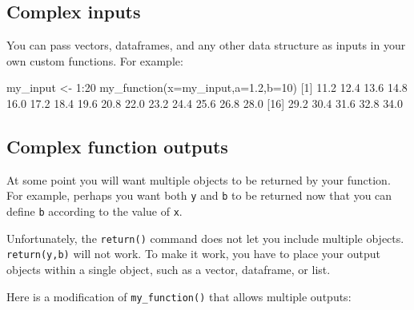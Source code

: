 \documentclass[
]{book}
\newenvironment{Shaded}{\begin{snugshade}}{\end{snugshade}}
\newcommand{\AttributeTok}[1]{\textcolor[rgb]{0.77,0.63,0.00}{#1}}
\newcommand{\DecValTok}[1]{\textcolor[rgb]{0.00,0.00,0.81}{#1}}
\newcommand{\FloatTok}[1]{\textcolor[rgb]{0.00,0.00,0.81}{#1}}
\newcommand{\FunctionTok}[1]{\textcolor[rgb]{0.00,0.00,0.00}{#1}}
\newcommand{\NormalTok}[1]{#1}
\newcommand{\OtherTok}[1]{\textcolor[rgb]{0.56,0.35,0.01}{#1}}
\newcommand{\SpecialCharTok}[1]{\textcolor[rgb]{0.00,0.00,0.00}{#1}}
\begin{document}
\hypertarget{complex-inputs}{%
\subsection*{Complex inputs}\label{complex-inputs}}

You can pass vectors, dataframes, and any other data structure as inputs in your own custom functions. For example:

\begin{Shaded}
\begin{Highlighting}[]
\NormalTok{my\_input }\OtherTok{\textless{}{-}} \DecValTok{1}\SpecialCharTok{:}\DecValTok{20}
\FunctionTok{my\_function}\NormalTok{(}\AttributeTok{x=}\NormalTok{my\_input,}\AttributeTok{a=}\FloatTok{1.2}\NormalTok{,}\AttributeTok{b=}\DecValTok{10}\NormalTok{)}
\NormalTok{ [}\DecValTok{1}\NormalTok{] }\FloatTok{11.2} \FloatTok{12.4} \FloatTok{13.6} \FloatTok{14.8} \FloatTok{16.0} \FloatTok{17.2} \FloatTok{18.4} \FloatTok{19.6} \FloatTok{20.8} \FloatTok{22.0} \FloatTok{23.2} \FloatTok{24.4} \FloatTok{25.6} \FloatTok{26.8} \FloatTok{28.0}
\NormalTok{[}\DecValTok{16}\NormalTok{] }\FloatTok{29.2} \FloatTok{30.4} \FloatTok{31.6} \FloatTok{32.8} \FloatTok{34.0}
\end{Highlighting}
\end{Shaded}

\hypertarget{complex-function-outputs}{%
\subsection*{Complex function outputs}\label{complex-function-outputs}}

At some point you will want multiple objects to be returned by your function. For example, perhaps you want both \texttt{y} and \texttt{b} to be returned now that you can define \texttt{b} according to the value of \texttt{x}.

Unfortunately, the \texttt{return()} command does not let you include multiple objects. \texttt{return(y,b)} will not work. To make it work, you have to place your output objects within a single object, such as a vector, dataframe, or list.

Here is a modification of \texttt{my\_function()} that allows multiple outputs:
\end{document}
